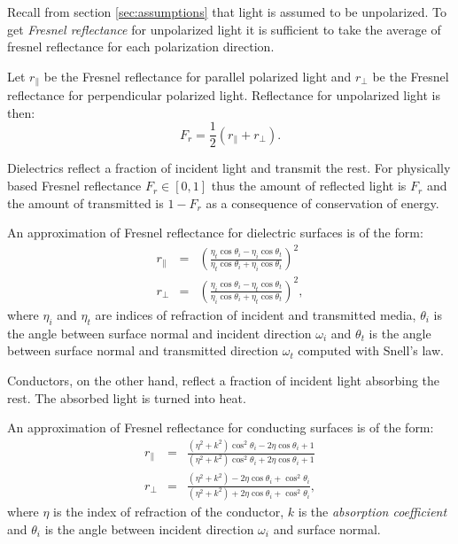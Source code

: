 Recall from section \ref{sec:assumptions} that light is assumed to be unpolarized. To get \emph{Fresnel reflectance} for unpolarized light it is sufficient to take the average of fresnel reflectance for each polarization direction.

\begin{df}
Let $r_{\parallel}$ be the Fresnel reflectance for parallel polarized light and $r_{\perp}$ be the Fresnel reflectance for perpendicular polarized light. Reflectance for unpolarized light is then:
\begin{equation}
  F_{r} = \frac{1}{2} (r_{\parallel} + r_{\perp}).
\end{equation}
\end{df}

Dielectrics reflect a fraction of incident light and transmit the rest. For physically based Fresnel reflectance $F_{r} \in [0,1]$ thus the amount of reflected light is $F_{r}$ and the amount of transmitted is $1 - F_{r}$ as a consequence of conservation of energy.

\begin{df}
An approximation of Fresnel reflectance for dielectric surfaces \parencite{phar2010} is of the form:
\begin{eqnarray}
r_{\parallel} &=& \left( \frac{\eta_{t} \cos\theta_{i} - \eta_{i} \cos\theta_{t}}{\eta_{t} \cos\theta_{i} + \eta_{i} \cos\theta_{t}} \right)^{2} \\
r_{\perp} &=& \left( \frac{\eta_{i} \cos\theta_{i} - \eta_{t} \cos\theta_{t}}{\eta_{i} \cos\theta_{i} + \eta_{t} \cos\theta_{t}} \right)^{2},
\end{eqnarray}
where $\eta_{i}$ and $\eta_{t}$ are indices of refraction of incident and transmitted media, $\theta_{i}$ is the angle between surface normal and incident direction $\omega_{i}$ and $\theta_{t}$ is the angle between surface normal and transmitted direction $\omega_{t}$ computed with Snell's law.
\end{df}

Conductors, on the other hand, reflect a fraction of incident light absorbing the rest. The absorbed light is turned into heat.

\begin{df}
An approximation of Fresnel reflectance for conducting surfaces \parencite{phar2010} is of the form:
\begin{eqnarray}
  r_{\parallel} &=& \frac{(\eta^{2} + k^{2}) \cos^{2}\theta_{i} - 2\eta\cos\theta_{i} + 1}{(\eta^{2} + k^{2}) \cos^{2}\theta_{i} + 2\eta\cos\theta_{i} + 1} \\
  r_{\perp} &=& \frac{(\eta^{2} + k^{2}) - 2\eta\cos\theta_{i} + \cos^{2}\theta_{i}}{(\eta^{2} + k^{2}) + 2\eta\cos\theta_{i} + \cos^{2}\theta_{i}},
\end{eqnarray}
where $\eta$ is the index of refraction of the conductor, $k$ is the \emph{absorption coefficient} and $\theta_{i}$ is the angle between incident direction $\omega_{i}$ and surface normal.
\end{df}

